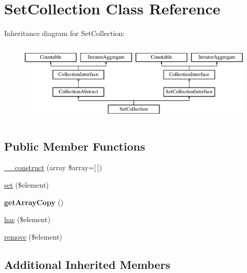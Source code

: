 \hypertarget{class_pes_1_1_collection_1_1_set_collection}{}\section{Set\+Collection Class Reference}
\label{class_pes_1_1_collection_1_1_set_collection}
Inheritance diagram for Set\+Collection\+:\begin{figure}[H]
\begin{center}
\leavevmode
\includegraphics[height=3.888889cm]{class_pes_1_1_collection_1_1_set_collection}
\end{center}
\end{figure}
\subsection*{Public Member Functions}
\begin{DoxyCompactItemize}
\item 
\mbox{\hyperlink{class_pes_1_1_collection_1_1_set_collection_a051ddc27b65d0b3d514a7b832bb60912}{\+\_\+\+\_\+construct}} (array \$array=\mbox{[}$\,$\mbox{]})
\item 
\mbox{\hyperlink{class_pes_1_1_collection_1_1_set_collection_a5cc5bdebebc52ea83f1e130cdf8d8d2d}{set}} (\$element)
\item 
\mbox{\label{class_pes_1_1_collection_1_1_set_collection_a9c9bae4e44ee76a926fa7ecdc49dd8b5}} 
{\bfseries get\+Array\+Copy} ()
\item 
\mbox{\hyperlink{class_pes_1_1_collection_1_1_set_collection_a9beff85b688d72139414bfed57757727}{has}} (\$element)
\item 
\mbox{\hyperlink{class_pes_1_1_collection_1_1_set_collection_a4e710ba89e011dd21d20b53b742ab1bc}{remove}} (\$element)
\end{DoxyCompactItemize}
\subsection*{Additional Inherited Members}


